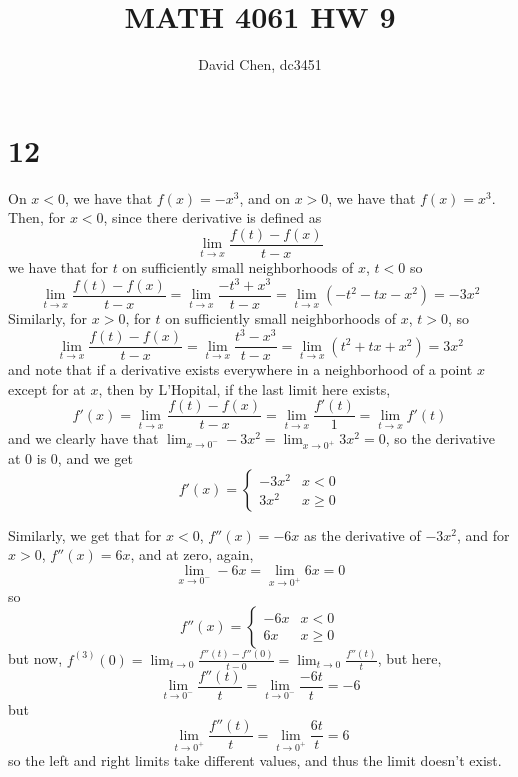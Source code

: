 \documentclass[12pt,letterpaper]{article}
\title{MATH 4061 HW 9}
\author{David Chen, dc3451}
\theoremstyle{definition}
\begin{document}
\maketitle

\section*{12}

On $x < 0$, we have that $f(x) = -x^{3}$, and on $x > 0$, we have that $f(x) = x^{3}$. Then, for $x < 0$, since there derivative is defined as
\[
  \lim_{t \rightarrow x}\frac{f(t) - f(x)}{t - x}
\]
we have that for $t$ on sufficiently small neighborhoods of $x$, $t < 0$ so
\[
  \lim_{t \rightarrow x}\frac{f(t) - f(x)}{t - x} = \lim_{t \rightarrow x}\frac{-t^{3} + x^{3}}{t - x} = \lim_{t \rightarrow x}(-t^{2} - tx - x^{2}) = -3x^{2}
\]
Similarly, for $x > 0$, for $t$ on sufficiently small neighborhoods of $x$, $t > 0$, so
\[
  \lim_{t \rightarrow x}\frac{f(t) - f(x)}{t - x} = \lim_{t \rightarrow x}\frac{t^{3} - x^{3}}{t - x} = \lim_{t \rightarrow x}(t^{2} + tx + x^{2}) = 3x^{2}
\]
and note that if a derivative exists everywhere in a neighborhood of a point $x$ except for at $x$, then by L'Hopital, if the last limit here exists,
\[
  f'(x) = \lim_{t \rightarrow x}\frac{f(t) - f(x)}{t - x} = \lim_{t \rightarrow x}\frac{f'(t)}{1} = \lim_{t \rightarrow x}f'(t)
\]
and we clearly have that $\lim_{x \rightarrow 0^{-}}-3x^{2} = \lim_{x \rightarrow 0^{+}}3x^{2} = 0$, so the derivative at $0$ is $0$, and we get
\[
  f'(x) = \begin{cases}
    -3x^{2} & x < 0 \\
    3x^{2} & x \geq 0
  \end{cases}
\]

Similarly, we get that for $x < 0$, $f''(x) = -6x$ as the derivative of $-3x^{2}$, and for $x > 0$, $f''(x) = 6x$, and at zero, again,
\[
  \lim_{x \rightarrow 0^{-}}-6x = \lim_{x \rightarrow 0^{+}}6x = 0
\]
so
\[
  f''(x) = \begin{cases}
    -6x & x < 0 \\
    6x & x \geq 0
  \end{cases}
\]
but now, $f^{(3)}(0) = \lim_{t \rightarrow 0}\frac{f''(t) - f''(0)}{t - 0} = \lim_{t \rightarrow 0}\frac{f''(t)}{t}$, but here,
\[
  \lim_{t \rightarrow 0^{-}}\frac{f''(t)}{t} = \lim_{t \rightarrow 0^{-}}\frac{-6t}{t} = -6
\]
but
\[
  \lim_{t \rightarrow 0^{+}}\frac{f''(t)}{t} = \lim_{t \rightarrow 0^{+}}\frac{6t}{t} = 6
\]
so the left and right limits take different values, and thus the limit doesn't exist.
\end{document}
